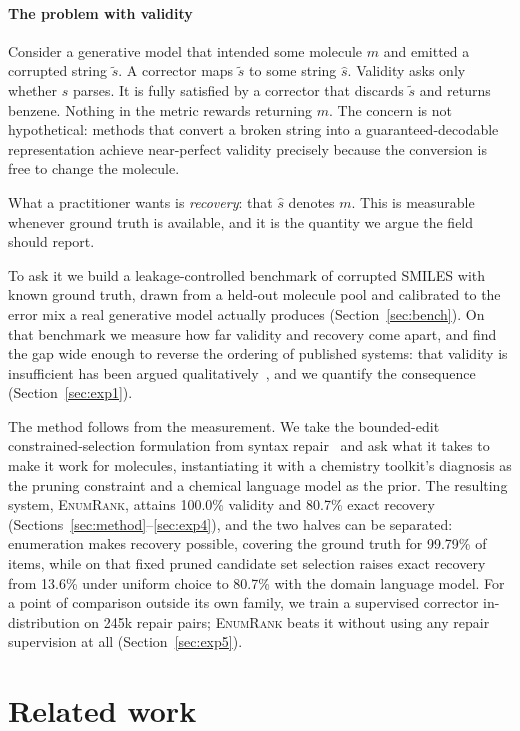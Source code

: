 \documentclass[conference]{IEEEtran}
\newcommand{\ours}{\textsc{EnumRank}}
\begin{document}
\paragraph{The problem with validity}
Consider a generative model that intended some molecule $m$ and emitted a
corrupted string $\tilde{s}$. A corrector maps $\tilde{s}$ to some string
$\hat{s}$. Validity asks only whether $\hat{s}$ parses. It is fully satisfied by
a corrector that discards $\tilde{s}$ and returns benzene. Nothing in the metric
rewards returning $m$. The concern is not hypothetical: methods that convert a
broken string into a guaranteed-decodable representation achieve near-perfect
validity precisely because the conversion is free to change the molecule.

What a practitioner wants is \emph{recovery}: that $\hat{s}$ denotes $m$. This
is measurable whenever ground truth is available, and it is the quantity we
argue the field should report.

To ask it we build a leakage-controlled benchmark of corrupted SMILES with known
ground truth, drawn from a held-out molecule pool and calibrated to the error mix
a real generative model actually produces (Section~\ref{sec:bench}). On that
benchmark we measure how far validity and recovery come apart, and find the gap
wide enough to reverse the ordering of published systems: that validity is
insufficient has been argued qualitatively~\citep{amrec}, and we quantify the
consequence (Section~\ref{sec:exp1}).

The method follows from the measurement. We take the bounded-edit
constrained-selection formulation from syntax repair~\citep{considine2025syntax}
and ask what it takes to make it work for molecules, instantiating it with a
chemistry toolkit's diagnosis as the pruning constraint and a chemical language
model as the prior. The resulting system, \ours{}, attains 100.0\% validity and
80.7\% exact recovery (Sections~\ref{sec:method}--\ref{sec:exp4}), and the two
halves can be separated: enumeration makes recovery possible, covering the
ground truth for 99.79\% of items, while on that fixed pruned candidate set
selection raises exact recovery from 13.6\% under uniform choice to 80.7\% with
the domain language model. For a point of comparison outside its own family, we
train a supervised corrector in-distribution on 245k repair pairs; \ours{} beats
it without using any repair supervision at all (Section~\ref{sec:exp5}).

\section{Related work}
\end{document}
